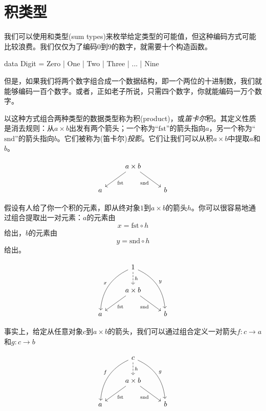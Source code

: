 \documentclass[DaoFP]{subfiles}
\begin{document}
\setcounter{chapter}{4}

\chapter{积类型}

我们可以使用和类型(sum types)来枚举给定类型的可能值，但这种编码方式可能比较浪费。我们仅仅为了编码0到9的数字，就需要十个构造函数。
\begin{haskell}
data Digit = Zero | One | Two | Three | ... | Nine
\end{haskell}
但是，如果我们将两个数字组合成一个数据结构，即一个两位的十进制数，我们就能够编码一百个数字。或者，正如老子所说，只需四个数字，你就能编码一万个数字。

以这种方式组合两种类型的数据类型称为积(product)，或\emph{笛卡尔}积。其定义性质是消去规则：从$a \times b$出发有两个箭头；一个称为``$\text{fst}$''的箭头指向$a$，另一个称为``$\text{snd}$''的箭头指向$b$。它们被称为(笛卡尔)\emph{投影}。它们让我们可以从积$a \times b$中提取$a$和$b$。

\[
 \begin{tikzcd}
& a \times b
 \arrow[dl,  "\text{fst}"]
 \arrow[dr,   "\text{snd}"']
\\
a && b
 \end{tikzcd}
\]

假设有人给了你一个积的元素，即从终对象$1$到$a \times b$的箭头$h$。你可以很容易地通过组合提取出一对元素：$a$的元素由
\[x = \text{fst} \circ h \]
给出，$b$的元素由
\[y = \text{snd} \circ h \]
给出。

\[
 \begin{tikzcd}
 & 1
\arrow[d, dashed, "h"]
 \arrow[ddl, bend right, "x"']
 \arrow[ddr, bend left, "y"]
\\
&a \times b
 \arrow[dl,  "\text{fst}"]
 \arrow[dr,   "\text{snd}"']
\\
a && b
 \end{tikzcd}
\]

事实上，给定从任意对象$c$到$a \times b$的箭头，我们可以通过组合定义一对箭头$f \colon c \to a$和$g \colon c \to b$

\[
 \begin{tikzcd}
 & c
\arrow[d, dashed, "h"]
 \arrow[ddl, bend right, "f"']
 \arrow[ddr, bend left, "g"]
\\
&a \times b
 \arrow[dl,  "\text{fst}"]
  \arrow[dr,   "\text{snd}"']
\\
a && b
 \end{tikzcd}
\]
\end{document}
